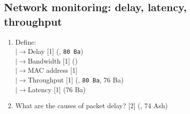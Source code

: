 \documentclass[12pt]{article}
\newcommand{\lb}{\\$\left|\rightarrow\right.$}
\begin{document}
	\subsection{Network monitoring: delay, latency, throughput}
		\begin{enumerate}[noitemsep, topsep=0pt]	
			\item Define:
			\lb Delay \hfill [1] (, \texttt{80 Ba})
			\lb Bandwidth \hfill [1] ()
			\lb MAC address \hfill [1] 
			\lb Throughput \hfill [1] (, \texttt{80 Ba}, 76 Ba)
			\lb Latency \hfill [1] (76 Ba)
			
			\item What are the causes of packet delay? \hfill [2] (, 74 Ash)
		\end{enumerate}
\end{document}

